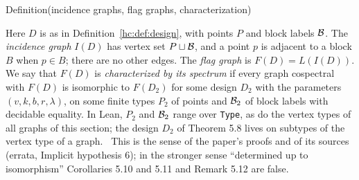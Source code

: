 \begin{namedresult}{Definition}{(incidence graphs, flag graphs, characterization)}\label{def:flag}
 \leavevmode\par
 Here $D$ is as in Definition~\ref{hc:def:design}, with points $P$ and block labels ${\mathcal B}$. The
 \emph{incidence graph} $I(D)$ has vertex set $P\sqcup{\mathcal B}$, and a point $p$ is adjacent to a
 block $B$ when $p\in B$; there are no other edges. The \emph{flag graph} is $F(D)=L(I(D))$. We
 say that $F(D)$ is \emph{characterized by its spectrum} if every graph cospectral with $F(D)$
 is isomorphic to $F(D_2)$ for some design $D_2$ with the parameters $(v,k,b,r,\lambda)$, on
 some finite types $P_2$ of points and ${\mathcal B}_2$ of block labels with decidable equality. In Lean,
 $P_2$ and ${\mathcal B}_2$ range over \texttt{Type}, as do the vertex types of all graphs of this section;
 the design $D_2$ of Theorem 5.8 lives on subtypes of the vertex type of a graph.
 \repair\ This is the sense of the paper's proofs and of its sources (errata, Implicit
 hypothesis 6); in the stronger sense ``determined up to isomorphism'' Corollaries 5.10 and 5.11
 and Remark 5.12 are false.
\end{namedresult}

